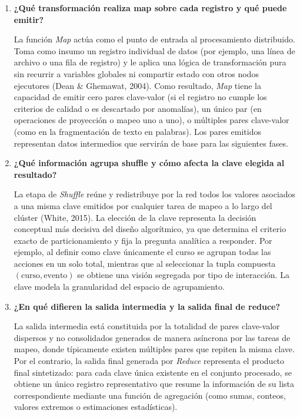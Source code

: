 \documentclass[12pt,a4paper]{article}
\begin{document}
\begin{enumerate}
    \item \textbf{¿Qué transformación realiza map sobre cada registro y qué puede emitir?}
    
    La función \textit{Map} actúa como el punto de entrada al procesamiento distribuido. Toma como insumo un registro individual de datos (por ejemplo, una línea de archivo o una fila de registro) y le aplica una lógica de transformación pura sin recurrir a variables globales ni compartir estado con otros nodos ejecutores (Dean \& Ghemawat, 2004). Como resultado, \textit{Map} tiene la capacidad de emitir cero pares clave-valor (si el registro no cumple los criterios de calidad o es descartado por anomalías), un único par (en operaciones de proyección o mapeo uno a uno), o múltiples pares clave-valor (como en la fragmentación de texto en palabras). Los pares emitidos representan datos intermedios que servirán de base para las siguientes fases.

    \item \textbf{¿Qué información agrupa shuffle y cómo afecta la clave elegida al resultado?}
    
    La etapa de \textit{Shuffle} reúne y redistribuye por la red todos los valores asociados a una misma clave emitidos por cualquier tarea de mapeo a lo largo del clúster (White, 2015). La elección de la clave representa la decisión conceptual más decisiva del diseño algorítmico, ya que determina el criterio exacto de particionamiento y fija la pregunta analítica a responder. Por ejemplo, al definir como clave únicamente el curso se agrupan todas las acciones en un solo total, mientras que al seleccionar la tupla compuesta $(\text{curso}, \text{evento})$ se obtiene una visión segregada por tipo de interacción. La clave modela la granularidad del espacio de agrupamiento.

    \item \textbf{¿En qué difieren la salida intermedia y la salida final de reduce?}
    
    La salida intermedia está constituida por la totalidad de pares clave-valor dispersos y no consolidados generados de manera asíncrona por las tareas de mapeo, donde típicamente existen múltiples pares que repiten la misma clave. Por el contrario, la salida final generada por \textit{Reduce} representa el producto final sintetizado: para cada clave única existente en el conjunto procesado, se obtiene un único registro representativo que resume la información de su lista correspondiente mediante una función de agregación (como sumas, conteos, valores extremos o estimaciones estadísticas).


\end{enumerate}
\end{document}
